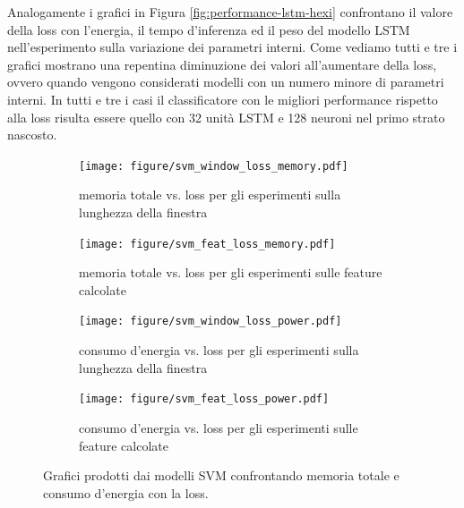 Analogamente i grafici in Figura \ref{fig:performance-lstm-hexi} confrontano il valore della loss con l'energia, il tempo d'inferenza ed il peso del modello LSTM nell'esperimento sulla variazione dei parametri interni. Come vediamo tutti e tre i grafici mostrano una repentina diminuzione dei valori all'aumentare della loss, ovvero quando vengono considerati modelli con un numero minore di parametri interni. In tutti e tre i casi il classificatore con le migliori performance rispetto alla loss risulta essere quello con 32 unità LSTM e 128 neuroni nel primo strato nascosto.

\begin{figure}[!htbp]
    \centering
    \begin{subfigure}[t]{.45\textwidth}
        \texttt{[image: figure/svm\_window\_loss\_memory.pdf]}
        \caption{memoria totale vs. loss per gli esperimenti sulla lunghezza della finestra}
        \label{fig:performance-svm-hexi:svm-memory-loss-window}
    \end{subfigure}
    \begin{subfigure}[t]{.45\textwidth}
        \texttt{[image: figure/svm\_feat\_loss\_memory.pdf]}
        \caption{memoria totale vs. loss per gli esperimenti sulle feature calcolate}
        \label{fig:performance-svm-hexi:svm-memory-loss-feature}
    \end{subfigure}
    \begin{subfigure}[t]{.45\textwidth}
        \texttt{[image: figure/svm\_window\_loss\_power.pdf]}
        \caption{consumo d'energia vs. loss per gli esperimenti sulla lunghezza della finestra}
        \label{fig:performance-svm-hexi:svm-power-loss-window}
    \end{subfigure}
    \begin{subfigure}[t]{.45\textwidth}
        \texttt{[image: figure/svm\_feat\_loss\_power.pdf]}
        \caption{consumo d'energia vs. loss per gli esperimenti sulle feature calcolate}
        \label{fig:performance-svm-hexi:svm-power-loss-feature}
    \end{subfigure}
    \caption{Grafici prodotti dai modelli SVM confrontando memoria totale e consumo d'energia con la loss.}
    \label{fig:performance-svm-hexi}
\end{figure}

